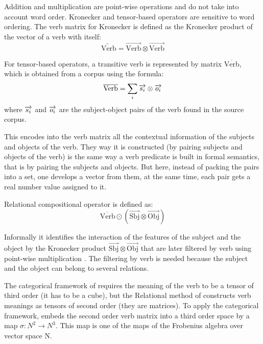 Addition and multiplication are point-wise operations and do not take into account word order. Kronecker and tensor-based operators are sensitive to word ordering. The verb matrix for Kronecker is defined as the Kronecker product of the vector of a verb with itself:
%
\begin{equation*}
  \widetilde{\text{Verb}} = \overrightarrow{\text{Verb}} \otimes \overrightarrow{\text{Verb}}
\end{equation*}

For tensor-based operators, a transitive verb is represented by matrix $\overline{\text{Verb}}$, which is obtained from a corpus using the formula:
$$
\overline{\text{Verb}} = \sum_i\overrightarrow{s_i} \otimes \overrightarrow{o_i}
$$
where $\overrightarrow{s_i}$ and $\overrightarrow{o_i}$ are the subject-object pairs of the verb found in the source corpus.

This encodes into the verb matrix all the contextual information of the subjects and objects of the verb. They way it is constructed (by pairing subjects and objects of the verb) is the same way a verb predicate is built in formal semantics, that is by pairing the subjects and objects. But here, instead of packing the pairs into a set, one develops a vector from them, at the same time, each pair gets a real number value assigned to it. 

Relational compositional operator is defined as:
\begin{equation*}
  \overline{\text{Verb}} \odot (\overrightarrow{\text{Sbj}} \otimes \overrightarrow{\text{Obj}})
\end{equation*}

Informally it identifies the interaction of the features of the subject and the object by the Kronecker product $\overrightarrow{\text{Sbj}} \otimes \overrightarrow{\text{Obj}}$ that are later filtered by verb using point-wise multiplication \cite{Grefenstette:2011:ESC:2145432.2145580}. The filtering by verb is needed because the subject and the object can belong to several relations.

The categorical framework of  requires the meaning of the verb to be a tensor of third order (it has to be a cube), but the Relational method of  constructs verb meanings as tensors of second order (they are matrices). To apply the categorical framework,  embeds the second order verb matrix into a third order space by a map $\sigma: N^2 \to N^3$. This map is one of the maps of the Frobenius algebra over vector space N.

